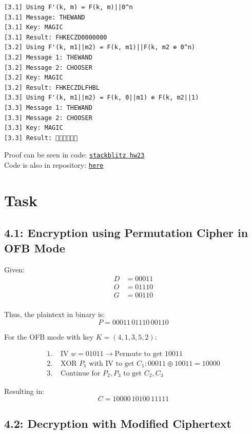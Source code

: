 \documentclass{article}
\begin{document}
\begin{verbatim}
[3.1] Using F'(k, m) = F(k, m)||0^n
[3.1] Message: THEWAND
[3.1] Key: MAGIC
[3.1] Result: FHKECZD0000000
[3.2] Using F'(k, m1||m2) = F(k, m1)||F(k, m2 ⊕ 0^n)
[3.2] Message 1: THEWAND
[3.2] Message 2: CHOOSER
[3.2] Key: MAGIC
[3.2] Result: FHKECZDLFHBL
[3.3] Using F'(k, m1||m2) = F(k, 0||m1) ⊕ F(k, m2||1)
[3.3] Message 1: THEWAND
[3.3] Message 2: CHOOSER
[3.3] Key: MAGIC
[3.3] Result: 
\end{verbatim}

Proof can be seen in code: \href{https://stackblitz.com/edit/js-ekqepc?devtoolsheight=80&file=hw23.js&hideDevTools=false}{\texttt{stackblitz hw23}}\\
Code is also in repository: \href{https://github.com/Nurech/js-ekqepc}{\texttt{here}}

\section{Task}%

\subsection*{4.1: Encryption using Permutation Cipher in OFB Mode}

Given:
\begin{align*}
  D &= 00011 \\
  O &= 01110 \\
  G &= 00110 \\
\end{align*}

Thus, the plaintext in binary is:
\[
  P = 00011\,01110\,00110
\]

For the OFB mode with key \( K = (4,1,3,5,2) \):

\begin{align*}
  1. &\text{ IV } w = 01011 \rightarrow \text{Permute to get } 10011 \\
  2. &\text{ XOR } P_1 \text{ with IV to get } C_1: 00011 \oplus 10011 = 10000 \\
  3. &\text{ Continue for } P_2, P_3 \text{ to get } C_2, C_3
\end{align*}

Resulting in:
\[
  C = 10000\,10100\,11111
\]

\subsection*{4.2: Decryption with Modified Ciphertext}
\end{document}
